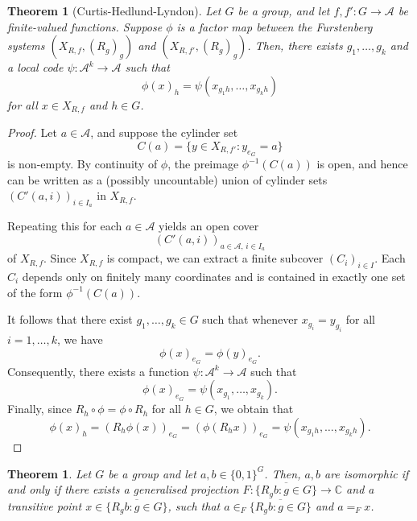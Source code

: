\documentclass{amsart}
\numberwithin{equation}{section}
\newtheorem{theorem}[lemma]{Theorem}
\theoremstyle{definition}
\theoremstyle{plain}
\newcommand{\C}{{\mathbb C}}
\begin{document}
\begin{theorem}[Curtis-Hedlund-Lyndon]\label{CHL}
Let $G$ be a group, and let $f,f':G\to \mathcal{A}$ be finite-valued functions. Suppose $\phi$ is a factor map between the Furstenberg systems $(X_{R,f},(R_g)_g)$ and $(X_{R,f'},(R_g)_g)$. Then, there exists $g_1,\dots,g_k$ and a local code $\psi:\mathcal{A}^k\to \mathcal{A}$ such that
$$\phi(x)_h=\psi(x_{g_1h},\dots,x_{g_kh})$$
for all $x\in X_{R,f}$ and $h\in G$.
\end{theorem}
\begin{proof}
Let $a \in \mathcal{A}$, and suppose the cylinder set 
\[
C(a) = \{y \in X_{R,f'} : y_{e_G} = a\}
\]
is non-empty. By continuity of $\phi$, the preimage $\phi^{-1}(C(a))$ 
is open, and hence can be written as a (possibly uncountable) union of 
cylinder sets $(C'(a,i))_{i \in I_a}$ in $X_{R,f}$. 

Repeating this for each $a \in \mathcal{A}$ yields an open cover 
\[
(C'(a,i))_{a \in \mathcal{A},\, i \in I_a}
\]
of $X_{R,f}$. Since $X_{R,f}$ is compact, we can extract a finite 
subcover $(C_i)_{i \in I}$. Each $C_i$ depends only on finitely many 
coordinates and is contained in exactly one set of the form 
$\phi^{-1}(C(a))$. 

It follows that there exist $g_1, \dots, g_k \in G$ such that whenever 
$x_{g_i} = y_{g_i}$ for all $i = 1, \dots, k$, we have 
\[
\phi(x)_{e_G} = \phi(y)_{e_G}.
\]
Consequently, there exists a function $\psi : \mathcal{A}^k \to \mathcal{A}$ 
such that
\[
\phi(x)_{e_G} = \psi(x_{g_1}, \dots, x_{g_k}).
\]
Finally, since $R_h \circ \phi = \phi \circ R_h$ for all $h \in G$, we obtain that
\[
\phi(x)_h 
= (R_h \phi(x))_{e_G} 
= (\phi(R_h x))_{e_G} 
= \psi(x_{g_1 h}, \dots, x_{g_k h}).
\]

\end{proof} 

\begin{theorem}\label{characterising isomorphic sets}
Let $G$ be a group and let $a,b\in \{0,1\}^G$. Then, $a,b$ are 
isomorphic if and only if there exists a generalised projection
$F:\overline{\{R_gb:g\in G\}} \to \C$ and a transitive point 
$x\in \overline{\{R_gb:g\in G\}}$, such that 
$a\in_F \overline{\{R_gb:g\in G\}}$ and $a=_F x$.    
\end{theorem}
\end{document}
